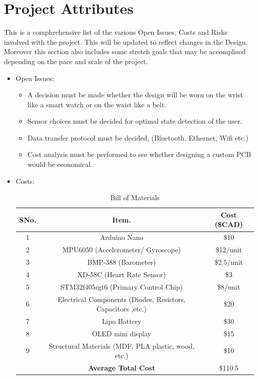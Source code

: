 \documentclass[12pt]{article}
\begin{document}
\section{Project Attributes}
This is a comphrehensive list of the various Open Issues, Costs and Risks involved with the project. This will be updated to reflect changes in the Design. Moreover this section also includes some stretch goals that may be accomplised depending on the pace and scale of the project.
\begin{itemize}
\item Open Issues:
	\begin{itemize}
		\item A decision must be made whether the design will be worn on the wrist like a smart watch or on the waist like a belt.
		\item Sensor choices must be decided for optimal state detection of the user.
		\item Data transfer protocol must be decided, (Bluetooth, Ethernet, Wifi etc.)
		\item Cost analysis must be performed to see whether designing a custom PCB would be economical.
	\end{itemize}
	

\item Costs:
		\begin{center}
		\begin{table}[H]
			\begin{tabular}{ |c|c|c| } 
				 \hline
				 	\textbf{SNo.} &  \textbf{Item.} &  \textbf{Cost (\$CAD)} \\ 
				 \hline
				 	1 & Arduino Nano 											& \$10 \\ 
				 \hline		
				 	2 & MPU6050 (Accelerometer/ Gyroscope)						& \$12/unit \\ 
				 \hline
				 	3 & BMP-388 (Barometer) 									& \$2.5/unit \\ 
				 \hline
				 	4 & XD-58C (Heart Rate Sensor)								& \$3\\ 
				 \hline
				 	5 & STM32f405rgt6 (Primary Control Chip) 						& \$8/unit \\ 
				 \hline
				 	6 & Electrical Components (Diodes, Resistors, Capacitors ,etc.) 		& \$20 \\ 
				 \hline
				 	7 & Lipo Battery 											& \$30 \\ 
				 \hline
				 	8 &OLED mini display										& \$15 \\ 
				 \hline
				 	9 & Structural Materials (MDF, PLA plastic, wood, etc.) 			& \$10 \\ 
				 \hline
				 	& \textbf{Average Total Cost}								& \$110.5 \\ 
				 \hline
			\end{tabular}
		\caption{\label{bom}Bill of Materials}  
		\end{table}
		\end{center}


\end{itemize}
\end{document}
